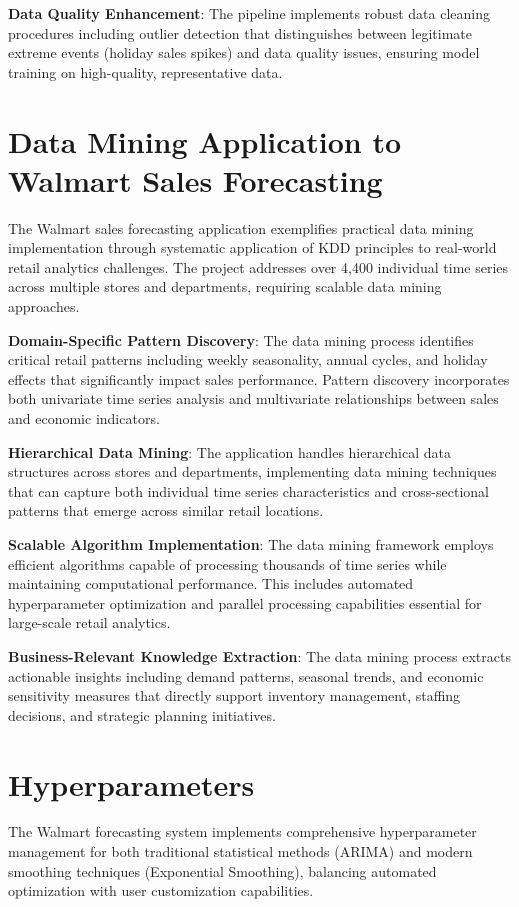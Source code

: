 \textbf{Data Quality Enhancement}: The pipeline implements robust data cleaning procedures including outlier detection that distinguishes between legitimate extreme events (holiday sales spikes) and data quality issues, ensuring model training on high-quality, representative data.

\section{Data Mining Application to Walmart Sales Forecasting}

The Walmart sales forecasting application exemplifies practical data mining implementation through systematic application of KDD principles to real-world retail analytics challenges. The project addresses over 4,400 individual time series across multiple stores and departments, requiring scalable data mining approaches.

\textbf{Domain-Specific Pattern Discovery}: The data mining process identifies critical retail patterns including weekly seasonality, annual cycles, and holiday effects that significantly impact sales performance. Pattern discovery incorporates both univariate time series analysis and multivariate relationships between sales and economic indicators.

\textbf{Hierarchical Data Mining}: The application handles hierarchical data structures across stores and departments, implementing data mining techniques that can capture both individual time series characteristics and cross-sectional patterns that emerge across similar retail locations.

\textbf{Scalable Algorithm Implementation}: The data mining framework employs efficient algorithms capable of processing thousands of time series while maintaining computational performance. This includes automated hyperparameter optimization and parallel processing capabilities essential for large-scale retail analytics.

\textbf{Business-Relevant Knowledge Extraction}: The data mining process extracts actionable insights including demand patterns, seasonal trends, and economic sensitivity measures that directly support inventory management, staffing decisions, and strategic planning initiatives.

\section{Hyperparameters}

The Walmart forecasting system implements comprehensive hyperparameter management for both traditional statistical methods (ARIMA) and modern smoothing techniques (Exponential Smoothing), balancing automated optimization with user customization capabilities.

